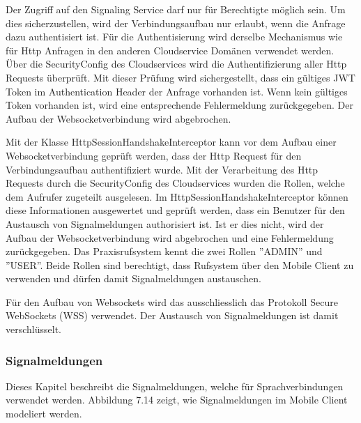 Der Zugriff auf den Signaling Service darf nur für Berechtigte möglich sein.
Um dies sicherzustellen, wird der Verbindungsaufbau nur erlaubt, wenn die Anfrage dazu authentisiert ist.
Für die Authentisierung wird derselbe Mechanismus wie für Http Anfragen in den anderen Cloudservice Domänen verwendet werden.
Über die SecurityConfig des Cloudservices wird die Authentifizierung aller Http Requests überprüft.
Mit dieser Prüfung wird sichergestellt, dass ein gültiges JWT Token im Authentication Header der Anfrage vorhanden ist.
Wenn kein gültiges Token vorhanden ist, wird eine entsprechende Fehlermeldung zurückgegeben.
Der Aufbau der Websocketverbindung wird abgebrochen.

Mit der Klasse HttpSessionHandshakeInterceptor kann vor dem Aufbau einer Websocketverbindung geprüft werden, dass der Http Request für den Verbindungsaufbau authentifiziert wurde.
Mit der Verarbeitung des Http Requests durch die SecurityConfig des Cloudservices wurden die Rollen, welche dem Aufrufer zugeteilt ausgelesen.
Im HttpSessionHandshakeInterceptor können diese Informationen ausgewertet und geprüft werden, dass ein Benutzer für den Austausch von Signalmeldungen authorisiert ist.
Ist er dies nicht, wird der Aufbau der Websocketverbindung wird abgebrochen und eine Fehlermeldung zurückgegeben.
Das Praxisrufsystem kennt die zwei Rollen ''ADMIN'' und ''USER''.
Beide Rollen sind berechtigt, dass Rufsystem über den Mobile Client zu verwenden und dürfen damit Signalmeldungen austauschen.

Für den Aufbau von Websockets wird das ausschliesslich das Protokoll Secure WebSockets (WSS) verwendet.
Der Austausch von Signalmeldungen ist damit verschlüsselt.

\clearpage

\subsubsection{Signalmeldungen}

Dieses Kapitel beschreibt die Signalmeldungen, welche für Sprachverbindungen verwendet werden.
Abbildung 7.14 zeigt, wie Signalmeldungen im Mobile Client modeliert werden.

